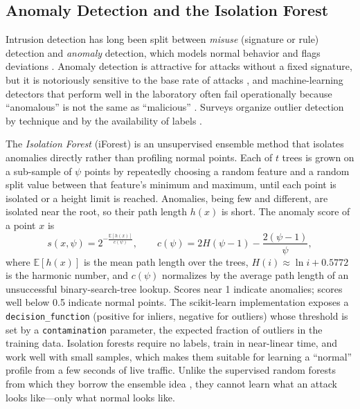 \documentclass[preprint,12pt]{elsarticle}
\begin{document}
\subsection{Anomaly Detection and the Isolation Forest}
\label{sec:bg-iforest}
Intrusion detection has long been split between \emph{misuse} (signature or rule)
detection and \emph{anomaly} detection, which models normal behavior and flags
deviations \cite{denning1987}. Anomaly detection is attractive for attacks without a
fixed signature, but it is notoriously sensitive to the base rate of attacks
\cite{axelsson2000}, and machine-learning detectors that perform well in the
laboratory often fail operationally because ``anomalous'' is not the same as
``malicious'' \cite{sommer2010}. Surveys organize outlier detection by technique and
by the availability of labels \cite{chandola2009,hodge2004}.

The \emph{Isolation Forest} (iForest) \cite{liu2008,liu2012} is an unsupervised
ensemble method that isolates anomalies directly rather than profiling normal points.
Each of $t$ trees is grown on a sub-sample of $\psi$ points by repeatedly choosing a
random feature and a random split value between that feature's minimum and maximum,
until each point is isolated or a height limit is reached. Anomalies, being few and
different, are isolated near the root, so their path length $h(x)$ is short. The
anomaly score of a point $x$ is
\begin{equation}
s(x,\psi) = 2^{-\frac{\mathbb{E}[h(x)]}{c(\psi)}}, \qquad
c(\psi) = 2H(\psi-1) - \frac{2(\psi-1)}{\psi},
\label{eq:iforest}
\end{equation}
where $\mathbb{E}[h(x)]$ is the mean path length over the trees, $H(i)\approx\ln i +
0.5772$ is the harmonic number, and $c(\psi)$ normalizes by the average path length of
an unsuccessful binary-search-tree lookup. Scores near 1 indicate anomalies; scores
well below 0.5 indicate normal points. The scikit-learn implementation
\cite{pedregosa2011} exposes a \texttt{decision\_function} (positive for inliers,
negative for outliers) whose threshold is set by a \texttt{contamination} parameter,
the expected fraction of outliers in the training data. Isolation forests require no
labels, train in near-linear time, and work well with small samples, which makes them
suitable for learning a ``normal'' profile from a few seconds of live traffic. Unlike
the supervised random forests from which they borrow the ensemble idea
\cite{breiman2001}, they cannot learn what an attack looks like---only what normal
looks like.
\end{document}
